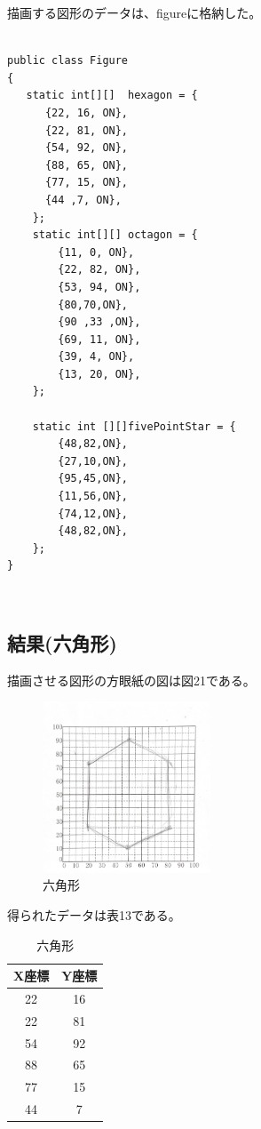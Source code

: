 \documentclass{jarticle}
\begin{document}
描画する図形のデータは、figureに格納した。

\begin{lstlisting}[caption=Figure]

public class Figure
{
   static int[][]  hexagon = {
      {22, 16, ON},
      {22, 81, ON},
      {54, 92, ON},
      {88, 65, ON},
      {77, 15, ON},
      {44 ,7, ON},
    }; 
    static int[][] octagon = {
        {11, 0, ON},
        {22, 82, ON},
        {53, 94, ON},
        {80,70,ON},
        {90 ,33 ,ON},
        {69, 11, ON},
        {39, 4, ON},
        {13, 20, ON},
    };    
    
    static int [][]fivePointStar = {
        {48,82,ON},
        {27,10,ON},
        {95,45,ON},
        {11,56,ON},
        {74,12,ON},
        {48,82,ON},
    };
}
\end{lstlisting}
\\
\subsection{結果(六角形)}
描画させる図形の方眼紙の図は図21である。
\begin{figure}[H]
    \centering
    
    \includegraphics[width=5cm]{8_6.pdf}
    \caption{六角形}
    \label{fig:my_label}
\end{figure}
得られたデータは表13である。

\begin{table}[H]
    \centering
    \caption{六角形}
    \begin{tabular}{c|c}
       X座標&Y座標 \\
    \hline\hline
    22 &16　\\
     22&81\\
    54&92\\
   88 &65\\
    77&15\\
    44&7\\
    \end{tabular}
    
    \label{tab:my_label}
\end{table}
\end{document}
